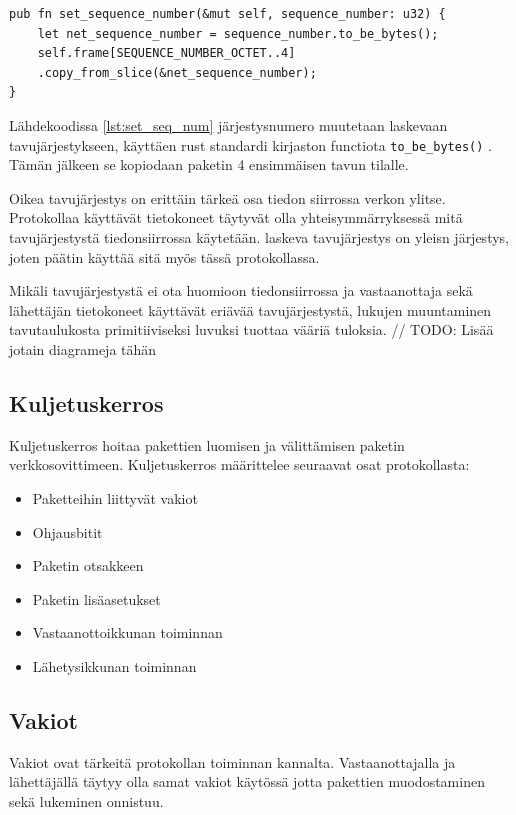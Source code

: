 \documentclass[a4paper,12pt]{article}
\begin{document}
\begin{lstlisting}[caption={Järjestusnumeron asettaminen pakettiin}, label={lst:set_seq_num}]
pub fn set_sequence_number(&mut self, sequence_number: u32) {
    let net_sequence_number = sequence_number.to_be_bytes();
    self.frame[SEQUENCE_NUMBER_OCTET..4]
    .copy_from_slice(&net_sequence_number);
}
\end{lstlisting}

Lähdekoodissa \ref{lst:set_seq_num} järjestysnumero muutetaan laskevaan tavujärjestykseen, käyttäen rust standardi kirjaston functiota \lstinline{to_be_bytes()} \cite{rust_doc_u32}. Tämän jälkeen se kopiodaan paketin 4 ensimmäisen tavun tilalle. \par
Oikea tavujärjestys on erittäin tärkeä osa tiedon siirrossa verkon ylitse. Protokollaa käyttävät tietokoneet täytyvät olla yhteisymmärryksessä mitä tavujärjestystä tiedonsiirrossa käytetään. laskeva tavujärjestys on yleisn järjestys, joten päätin käyttää sitä myös tässä protokollassa. \par
Mikäli tavujärjestystä ei ota huomioon tiedonsiirrossa ja vastaanottaja sekä lähettäjän tietokoneet käyttävät eriävää tavujärjestystä, lukujen muuntaminen tavutaulukosta primitiiviseksi luvuksi tuottaa vääriä tuloksia.
\cite{Adiga2007HowC}
// TODO: Lisää jotain diagrameja tähän

    \subsection{Kuljetuskerros}\label{subsec:kuljetuskerros}
    Kuljetuskerros hoitaa pakettien luomisen ja välittämisen paketin verkkosovittimeen.
    Kuljetuskerros määrittelee seuraavat osat protokollasta:

    \begin{itemize}
        \item Paketteihin liittyvät vakiot
        \item Ohjausbitit
        \item Paketin otsakkeen
        \item Paketin lisäasetukset
        \item Vastaanottoikkunan toiminnan
        \item Lähetysikkunan toiminnan
    \end{itemize}

    \subsection{Vakiot}
    Vakiot ovat tärkeitä protokollan toiminnan kannalta. Vastaanottajalla ja lähettäjällä täytyy olla samat vakiot käytössä jotta pakettien muodostaminen sekä lukeminen onnistuu.
\end{document}
